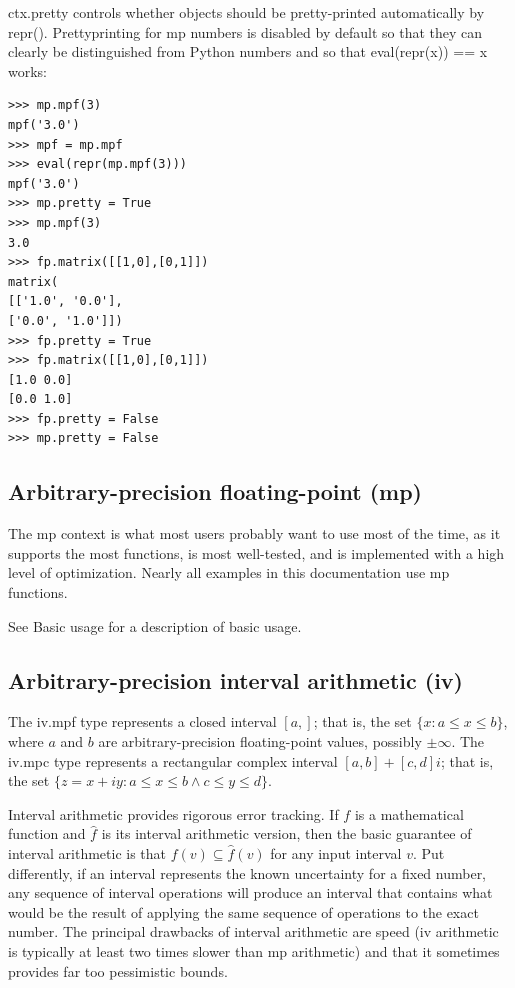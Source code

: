 ctx.pretty controls whether objects should be pretty-printed automatically by repr(). Prettyprinting for mp numbers is disabled by default so that they can clearly be distinguished from Python numbers and so that eval(repr(x)) == x works:

\begin{lstlisting}
>>> mp.mpf(3)
mpf('3.0')
>>> mpf = mp.mpf
>>> eval(repr(mp.mpf(3)))
mpf('3.0')
>>> mp.pretty = True
>>> mp.mpf(3)
3.0
>>> fp.matrix([[1,0],[0,1]])
matrix(
[['1.0', '0.0'],
['0.0', '1.0']])
>>> fp.pretty = True
>>> fp.matrix([[1,0],[0,1]])
[1.0 0.0]
[0.0 1.0]
>>> fp.pretty = False
>>> mp.pretty = False
\end{lstlisting}



\subsection{Arbitrary-precision floating-point (mp)}  

The mp context is what most users probably want to use most of the time, as it supports the most functions, is most well-tested, and is implemented with a high level of optimization. Nearly all examples in this documentation use mp functions.

See Basic usage for a description of basic usage.


\subsection{Arbitrary-precision interval arithmetic (iv)}  

The iv.mpf type represents a closed interval $[a,]$; that is, the set $\{x: a \leq x \leq b\}$, where $a$ and $b $ are arbitrary-precision floating-point values, possibly $\pm\infty$. The iv.mpc type represents a rectangular complex interval $[a,b] + [c,d]i$; that is, the set $\{z=x+iy: a \leq x \leq b \wedge c \leq y \leq d\}$.

\vpara
Interval arithmetic provides rigorous error tracking. If  $f$ is a mathematical function and $\hat{f}$ is its interval arithmetic version, then the basic guarantee of interval arithmetic is that $f(v) \subseteq \hat{f}(v)$ for any input interval $v$. Put differently, if an interval represents the known uncertainty for a fixed number, any sequence of interval operations will produce an interval that contains what would be the result of applying the same sequence of operations to the exact number. The principal drawbacks of interval arithmetic are speed (iv arithmetic is typically at least two times slower than mp arithmetic) and that it sometimes provides far too pessimistic bounds.


